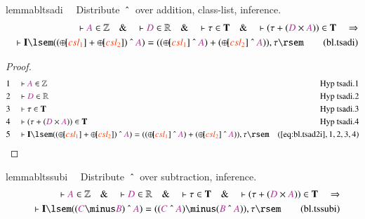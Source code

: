 \begin{restatable}{lemma}{bltsadi}~~ Distribute $~\string^~$ over addition,
class-list, inference.
\begin{align}
\vdash \mc{A} \in \mathbb{Z}\quad\&\quad \vdash \mc{D} \in
    \mathbb{R}\quad\&\quad \vdash \tau \in \mathbf{T}\quad\&\quad \vdash ( \tau
    + ( \mc{D} \times \mc{A} ) ) \in \mathbf{T}\quad\Rightarrow \notag \\ %
     \quad \vdash
    \mathbf{I} \lsem ( ( {\oplus\hspace{-1pt}[} \msc{csl_1} ] +
    {\oplus\hspace{-1pt}[} \msc{csl_2} ] ) ~\string^~ \mc{A} ) = ( (
    {\oplus\hspace{-1pt}[} \msc{csl_1} ] ~\string^~ \mc{A} ) + (
    {\oplus\hspace{-1pt}[} \msc{csl_2} ] ~\string^~ \mc{A} ) ) , \tau
    \rsem\label{eq:bl.tsadi}\tag{bl.tsadi}
\end{align}
\end{restatable}

\begin{proof}
\begin{align}
  1 &&  & \vdash \mc{A} \in \mathbb{Z}&\text{Hyp~tsadi.1}\notag%
  \\ 2 &&  & \vdash \mc{D} \in \mathbb{R}&\text{Hyp~tsadi.2}\notag%
  \\ 3 &&  & \vdash \tau \in \mathbf{T}&\text{Hyp~tsadi.3}\notag%
  \\ 4 &&  & \vdash ( \tau + ( \mc{D} \times \mc{A} ) ) \in
      \mathbf{T}&\text{Hyp~tsadi.4}\notag%
  \\ 5 &&  & \vdash \mathbf{I} \lsem ( ( {\oplus\hspace{-1pt}[} \msc{csl_1} ] +
      {\oplus\hspace{-1pt}[} \msc{csl_2} ] ) ~\string^~
      \mc{A} ) = ( ( {\oplus\hspace{-1pt}[} \msc{csl_1} ]
      ~\string^~ \mc{A} ) + ( {\oplus\hspace{-1pt}[}
      \msc{csl_2} ] ~\string^~ \mc{A} ) ) , \tau
      \rsem&(\mbox{\ref{eq:bl.tsad2i}},1,2,3,4)\notag
\end{align}
\end{proof}

\begin{restatable}{lemma}{bltssubi}~~ Distribute $~\string^~$ over subtraction,
inference.
\begin{align}
\vdash \mc{A} \in \mathbb{Z}\quad\&\quad \vdash \mc{D} \in
    \mathbb{R}\quad\&\quad \vdash \tau \in \mathbf{T}\quad\&\quad \vdash ( \tau
    + ( \mc{D} \times \mc{A} ) ) \in \mathbf{T}\quad\Rightarrow \notag \\ %
     \quad \vdash
    \mathbf{I} \lsem ( ( \mc{C} \minus \mc{B} ) ~\string^~ \mc{A} ) = ( (
    \mc{C} ~\string^~ \mc{A} ) \minus ( \mc{B} ~\string^~ \mc{A} ) ) , \tau
    \rsem\label{eq:bl.tssubi}\tag{bl.tssubi}
\end{align}
\end{restatable}

